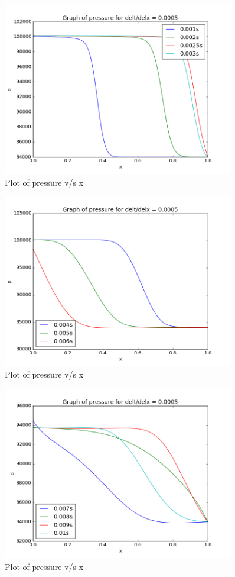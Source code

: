 \documentclass[11pt, a4paper]{article}
\begin{document}
\begin{figure}[H]
 \centering
 \includegraphics[width = 0.9\textwidth]{lax_fed_2_7.png}
 \caption{Plot of pressure v/s x}
\end{figure}
\begin{figure}[H]
 \centering
 \includegraphics[width = 0.9\textwidth]{lax_fed_2_8.png}
 \caption{Plot of pressure v/s x}
\end{figure}
\begin{figure}[H]
 \centering
 \includegraphics[width = 0.9\textwidth]{lax_fed_2_9.png}
 \caption{Plot of pressure v/s x}
\end{figure}
\end{document}

